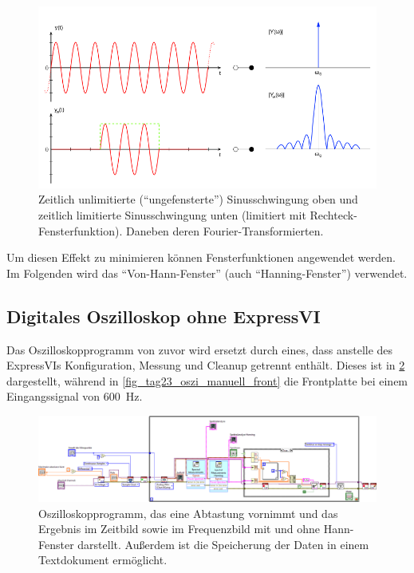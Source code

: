 \documentclass[
a4paper,
12pt,
pagesize,
ngerman
]{scrartcl}
\begin{document}
	\begin{figure}[H]  
		\includegraphics[width=1\textwidth]{EIRE2018Dateien/sonstige_Dateien/leakage}
		\centering
		\caption{
			Zeitlich unlimitierte (\enquote{ungefensterte}) Sinusschwingung oben und zeitlich limitierte Sinusschwingung unten (limitiert mit Rechteck-Fensterfunktion). Daneben deren Fourier-Transformierten. \cite{Leakage} %
		}
		\label{fig_leakage_veranschaulichung}
		\centering
	\end{figure}

	Um diesen Effekt zu minimieren können Fensterfunktionen angewendet werden. %
	Im Folgenden wird das \enquote{Von-Hann-Fenster} (auch \enquote{Hanning-Fenster}) verwendet. %
	

	\subsection{Digitales Oszilloskop ohne ExpressVI} %
	Das Oszilloskopprogramm von zuvor wird ersetzt durch eines, dass anstelle des ExpressVIs Konfiguration, Messung und Cleanup getrennt enthält.
	Dieses ist in \cref{fig_tag23_oszi_manuell_block} dargestellt, während in \cref{fig_tag23_oszi_manuell_front} die Frontplatte bei einem Eingangssignal von \SI{600}{\hertz}.
	
	\begin{figure}[H]  
		\includegraphics[width=1\textwidth]{EIRE2018Dateien/Tag3/ManuellVId}
		\centering
		\caption{
			Oszilloskopprogramm, das eine Abtastung vornimmt und das Ergebnis im Zeitbild sowie im Frequenzbild mit und ohne Hann-Fenster darstellt.
			Außerdem ist die Speicherung der Daten in einem Textdokument ermöglicht.
		}
		\label{fig_tag23_oszi_manuell_block}
		\centering
	\end{figure}
\end{document}
